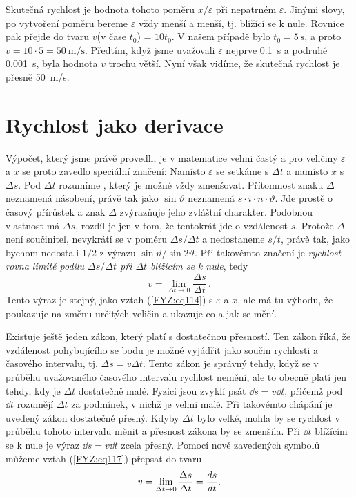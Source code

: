 {    Skutečná rychlost je hodnota tohoto poměru \(x/\varepsilon\) při nepatrném \(\varepsilon\). 
    Jinými slovy, po vytvoření poměru bereme \(\varepsilon\) vždy menší a menší, tj. blížící se k 
    nule. Rovnice pak přejde do tvaru \(v\)(v čase \(t_0\)) = \(10t_0\). V našem případě bylo \(t_0 
    = \SI{5}{\s}\), a proto \(v = 10\cdot5 = \SI{50}{\m/\s}\). Předtím, když jsme uvažovali 
    \(\varepsilon\) nejprve \SI{0.1}{\s} a podruhé \SI{0.001}{\s}, byla hodnota \(v\) trochu větší. 
    Nyní však vidíme, že skutečná rychlost je přesně \SI{50}{\m/\s}.
    
  \section{Rychlost jako derivace}
    Výpočet, který jsme právě provedli, je v matematice velmi častý a pro veličiny \(\varepsilon\) 
    a \(x\) se proto zavedlo speciální značení: Namísto \(\varepsilon\) se setkáme s \(\Delta t\) a 
    namísto \(x\) s \(\Delta s\). Pod \(\Delta t\) rozumíme , který je 
    možné vždy zmenšovat. Přítomnost znaku \(\Delta\) neznamená násobení, právě tak jako 
    \(\sin\vartheta\) neznamená \(s\cdot i \cdot n \cdot \vartheta\). Jde prostě o časový přírůstek 
    a znak \(\Delta\) zvýrazňuje jeho zvláštní charakter. Podobnou vlastnost má \(\Delta s\), 
    rozdíl je jen v tom, že tentokrát jde o vzdálenost \(s\). Protože \(\Delta\) není součinitel, 
    nevykrátí se v poměru \(\Delta s/\Delta t\) a nedostaneme \(s/t\), právě tak, jako bychom 
    nedostali \(1/2\) z výrazu \(\sin \vartheta/\sin2\vartheta\). Při takovémto značení je 
    \emph{rychlost rovna limitě podílu \(\Delta s/\Delta t\) při \(\Delta t\) blížícím se k nule}, 
    tedy
    \begin{equation}\label{FYZ:eq117}
      \boxed{v = \lim_{\Delta t\to 0}{\frac{\Delta s}{\Delta t}}}\,.
    \end{equation}
    Tento výraz je stejný, jako vztah (\ref{FYZ:eq114}) s \(\varepsilon\) a \(x\), ale má tu 
    výhodu, že poukazuje na změnu určitých veličin a ukazuje co a jak se mění.
    
    Existuje ještě jeden zákon, který platí s dostatečnou přesností. Ten zákon říká, že vzdálenost 
    pohybujícího se bodu je možné vyjádřit jako součin rychlosti a časového intervalu, tj. \(\Delta 
    s = v\Delta t\). Tento zákon je správný tehdy, když se v průběhu uvažovaného časového intervalu 
    rychlost nemění, ale to obecně platí jen tehdy, kdy je \(\Delta t\) dostatečně malé. Fyzici 
    jsou zvyklí psát \(\dd{s} = v\dd{t}\), přičemž pod \(\dd{t}\) rozumějí \(\Delta t\) za 
    podmínek, v nichž je velmi malé. Při takovémto chápání je uvedený zákon dostatečně přesný. 
    Kdyby \(\Delta t\) bylo velké, mohla by se rychlost v průběhu tohoto intervalu měnit a přesnost 
    zákona by se zmenšila. Při \(\dd{t}\) blížícím se k nule je výraz \(\dd{s} = v\dd{t}\) zcela 
    přesný. Pomocí nově zavedených symbolů můžeme vztah (\ref{FYZ:eq117}) přepsat do tvaru
    \begin{equation}\label{FYZ:eq118}
      v = \lim_{\Delta t\to 0}{\frac{\Delta s}{\Delta t}} = \dfrac{d s}{d t}.
    \end{equation}
    
}
